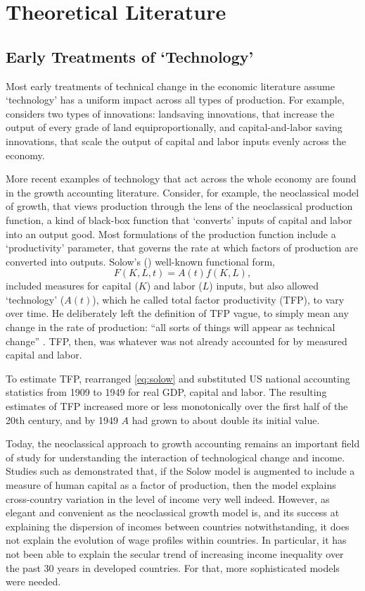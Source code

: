 \chapter{Theoretical Literature}\label{ch:2}


\section{Early Treatments of `Technology'}

Most early treatments of technical change in the economic literature assume `technology' has a uniform impact across all types of production. For example, \citet{Ricardo1819} considers two types of innovations: landsaving innovations, that increase the output of every grade of land equiproportionally, and capital-and-labor saving innovations, that scale the output of capital and labor inputs evenly across the economy. 

More recent examples of technology that act across the whole economy are found in the growth accounting literature. Consider, for example, the neoclassical model of growth, that views production through the lens of the neoclassical production function, a kind of black-box function that `converts' inputs of capital and labor into an output good. Most formulations of the production function include a `productivity' parameter, that governs the rate at which factors of production are converted into outputs. Solow's (\citeyear{Solow1957}) well-known functional form, \begin{equation}\label{eq:solow}
F(K,L,t)=A(t)f(K,L),
\end{equation}
included measures for capital ($K$) and labor ($L$) inputs, but also allowed `technology' ($A(t)$), which he called total factor productivity (TFP), to vary over time. He deliberately left the definition of TFP vague, to simply mean any change in the rate of production: ``all sorts of things will appear as technical change'' \citep[p.312]{Solow1957}. TFP, then, was whatever was not already accounted for by measured capital and labor.

To estimate TFP, \citet{Solow1957} rearranged \eqref{eq:solow} and substituted US national accounting statistics from 1909 to 1949 for real GDP, capital and labor. The resulting estimates of TFP increased more or less monotonically over the first half of the 20th century, and by 1949 $A$ had grown to about double its initial value.

Today, the neoclassical approach to growth accounting remains an important field of study for understanding the interaction of technological change and income. Studies such as \citet{Mankiw1992} demonstrated that, if the Solow model is augmented to include a measure of human capital as a factor of production, then the model explains cross-country variation in the level of income very well indeed. However, as elegant and convenient as the neoclassical growth model is, and its success at explaining the dispersion of incomes between countries notwithstanding, it does not explain the evolution of wage profiles within countries. In particular, it has not been able to explain the secular trend of increasing income inequality over the past 30 years in developed countries. For that, more sophisticated models were needed.

